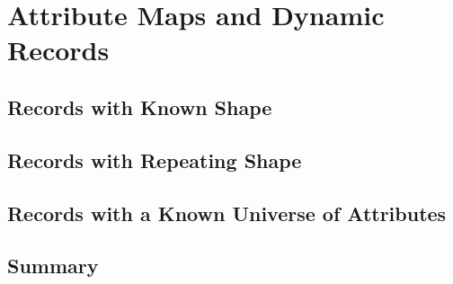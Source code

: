\chapter{Attribute Maps and Dynamic Records}
\label{chapter:dynamic-records}

\section{Records with Known Shape}
\label{sec:records-fixed-shape}

\section{Records with Repeating Shape}
\label{sec:records-repeating-shape}

\section{Records with a Known Universe of Attributes}
\label{sec:records-known-attribute-universe}

\section{Summary}
